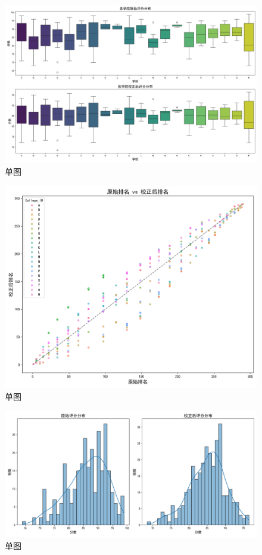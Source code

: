\documentclass[withoutpreface,bwprint]{cumcmthesis}
\begin{document}
\begin{figure}[H]
\centering
\includegraphics[width=1\textwidth]{figures/Results_Visualization/college_scores_comparison.png}
\caption{单图}
\label{fig:单图}
\end{figure}


\begin{figure}[H]
\centering
\includegraphics[width=1\textwidth]{figures/Results_Visualization/rank_comparison_scatter.png}
\caption{单图}
\label{fig:单图}
\end{figure}


\begin{figure}[H]
\centering
\includegraphics[width=1\textwidth]{figures/Results_Visualization/score_distributions_comparison.png}
\caption{单图}
\label{fig:单图}
\end{figure}
\end{document}
